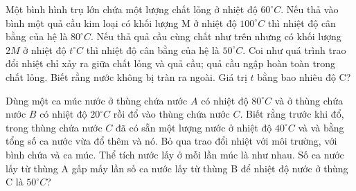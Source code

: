\begin{ex} 
	Một bình hình trụ lớn chứa một lượng chất lỏng ở nhiệt độ $60^\circ C$. Nếu thả vào bình một quả cầu kim loại có khối lượng M ở nhiệt độ $100^\circ C$ thì nhiệt độ cân bằng của hệ là $80^\circ C$. Nếu thả quả cầu cùng chất như trên nhưng có khối lượng $2M$ ở nhiệt độ $t^\circ C$ thì nhiệt độ cân bằng của hệ là $50^\circ C$. Coi như quá trình trao đổi nhiệt chỉ xảy ra giữa chất lỏng và quả cầu; quả cầu ngập hoàn toàn trong chất lỏng. Biết rằng nước không bị tràn ra ngoài. Giá trị $t$ bằng bao nhiêu độ C?
\end{ex}

\begin{ex} 
	Dùng một ca múc nước ở thùng chứa nước $A$ có nhiệt độ $80^{\circ} C$ và ở thùng chứa nước $B$ có nhiệt độ $20^{\circ} C$ rồi đổ vào thùng chứa nước $C$. Biết rằng trước khi đổ, trong thùng chứa nước $C$ đã có sẵn một lượng nước ở nhiệt độ $40^{\circ} C$ và và bằng tổng số ca nước vừa đổ thêm và nó. Bỏ qua trao đổi nhiệt với môi trường, với bình chứa và ca múc. Thể tích nước lấy ở mỗi lần múc là như nhau. Số ca nước lấy từ thùng A gấp mấy lần số ca nước lấy từ thùng B để nhiệt độ nước ở thùng C là $50^\circ C$?
\end{ex}

